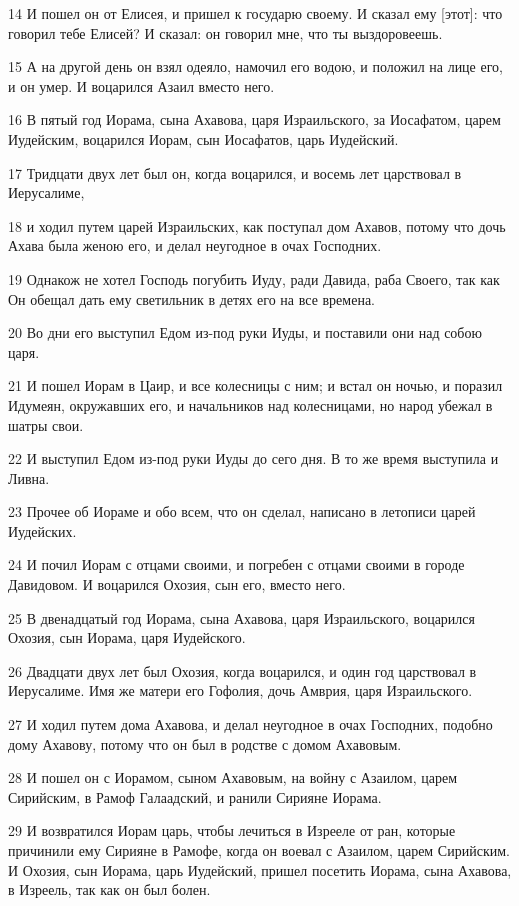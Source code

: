 \par 14 И пошел он от Елисея, и пришел к государю своему. И сказал ему [этот]: что говорил тебе Елисей? И сказал: он говорил мне, что ты выздоровеешь.
\par 15 А на другой день он взял одеяло, намочил его водою, и положил на лице его, и он умер. И воцарился Азаил вместо него.
\par 16 В пятый год Иорама, сына Ахавова, царя Израильского, за Иосафатом, царем Иудейским, воцарился Иорам, сын Иосафатов, царь Иудейский.
\par 17 Тридцати двух лет был он, когда воцарился, и восемь лет царствовал в Иерусалиме,
\par 18 и ходил путем царей Израильских, как поступал дом Ахавов, потому что дочь Ахава была женою его, и делал неугодное в очах Господних.
\par 19 Однакож не хотел Господь погубить Иуду, ради Давида, раба Своего, так как Он обещал дать ему светильник в детях его на все времена.
\par 20 Во дни его выступил Едом из-под руки Иуды, и поставили они над собою царя.
\par 21 И пошел Иорам в Цаир, и все колесницы с ним; и встал он ночью, и поразил Идумеян, окружавших его, и начальников над колесницами, но народ убежал в шатры свои.
\par 22 И выступил Едом из-под руки Иуды до сего дня. В то же время выступила и Ливна.
\par 23 Прочее об Иораме и обо всем, что он сделал, написано в летописи царей Иудейских.
\par 24 И почил Иорам с отцами своими, и погребен с отцами своими в городе Давидовом. И воцарился Охозия, сын его, вместо него.
\par 25 В двенадцатый год Иорама, сына Ахавова, царя Израильского, воцарился Охозия, сын Иорама, царя Иудейского.
\par 26 Двадцати двух лет был Охозия, когда воцарился, и один год царствовал в Иерусалиме. Имя же матери его Гофолия, дочь Амврия, царя Израильского.
\par 27 И ходил путем дома Ахавова, и делал неугодное в очах Господних, подобно дому Ахавову, потому что он был в родстве с домом Ахавовым.
\par 28 И пошел он с Иорамом, сыном Ахавовым, на войну с Азаилом, царем Сирийским, в Рамоф Галаадский, и ранили Сирияне Иорама.
\par 29 И возвратился Иорам царь, чтобы лечиться в Изрееле от ран, которые причинили ему Сирияне в Рамофе, когда он воевал с Азаилом, царем Сирийским. И Охозия, сын Иорама, царь Иудейский, пришел посетить Иорама, сына Ахавова, в Изреель, так как он был болен.

